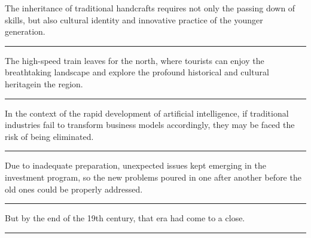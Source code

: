 \documentclass[11pt,a4paper]{article}
\newcommand{\num}[1]{\makebox[1.9em][r]{#1.}\hspace{0.3em}}
\newcommand{\wline}{\noindent\rule{\linewidth}{0.4pt}}
\begin{document}
\begin{minipage}{\linewidth}

\num{32}The inheritance of traditional handcrafts requires not only the passing down of skills, but also cultural identity and innovative practice of the younger generation.

\vspace{0.25em}

\wline

\end{minipage}

\begin{minipage}{\linewidth}

\num{33}The high-speed train leaves for the north, where tourists can enjoy the breathtaking landscape and explore the profound historical and cultural heritagein the region.

\vspace{0.25em}

\wline

\end{minipage}

\begin{minipage}{\linewidth}

\num{34}In the context of the rapid development of artificial intelligence, if traditional industries fail to transform business models accordingly, they may be faced the risk of being eliminated.

\vspace{0.25em}

\wline

\end{minipage}

\begin{minipage}{\linewidth}

\num{35}Due to inadequate preparation, unexpected issues kept emerging in the investment program, so the new problems poured in one after another before the old ones could be properly addressed.

\vspace{0.25em}

\wline

\end{minipage}

\vspace{0.35em}\vspace{0.15em}

\begin{minipage}{\linewidth}

\num{36}But by the end of the 19th century, that era had come to a close.

\vspace{0.25em}

\wline

\end{minipage}
\end{document}
